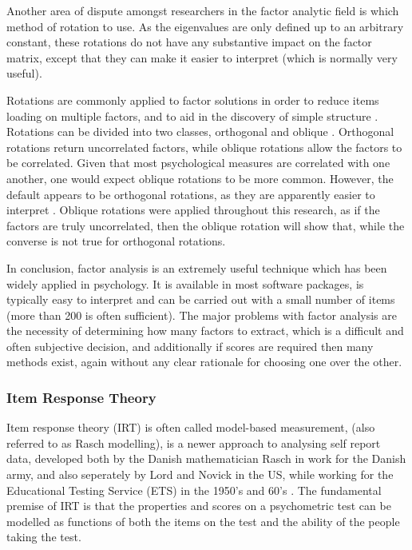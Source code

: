 Another area of dispute amongst researchers in the factor analytic field is which method of rotation to use\cite{sass2010comparative}. As the eigenvalues are only defined up to an arbitrary constant, these rotations do not have any substantive impact on the factor matrix, except that they can make it easier to interpret (which is normally very useful). 

Rotations are commonly applied to factor solutions in order to reduce items loading on multiple factors, and to aid in the discovery of simple structure \cite{henson2006use}. Rotations can be divided into two classes, orthogonal and oblique \cite{sass2010comparative}. Orthogonal rotations return uncorrelated factors, while oblique rotations allow the factors to be correlated. Given that most psychological measures are correlated with one another, one would expect oblique rotations to be more common. However, the default appears to be orthogonal rotations, as they are apparently easier to interpret \cite{henson2006use}. Oblique rotations were applied throughout this research, as if the factors are truly uncorrelated, then the oblique rotation will show that, while the converse is not true for orthogonal rotations.

In conclusion, factor analysis is an extremely useful technique which has been widely applied in psychology. It is available in most software packages, is typically easy to interpret and can be carried out with a small number of items (more than 200 is often sufficient). The major problems with factor analysis are the necessity of determining how many factors to extract, which is a difficult and often subjective decision, and additionally if scores are required then many methods exist, again without any clear rationale for choosing one over the other.  

\subsubsection{Item Response Theory}
\label{sec:item-response-theory}
Item response theory (IRT) is often called model-based measurement\cite{fischer1995rasch}, (also referred to as Rasch modelling), is a newer approach to analysing self report data, developed both by the Danish mathematician Rasch in work for the Danish army, and also seperately by Lord and Novick in the US, while working for the Educational Testing Service (ETS) in the 1950's and 60's \cite{van1997handbook}.
The fundamental premise of IRT is that the properties and scores on a psychometric test can be modelled as functions of both the items on the test and the ability of the people taking the test.

